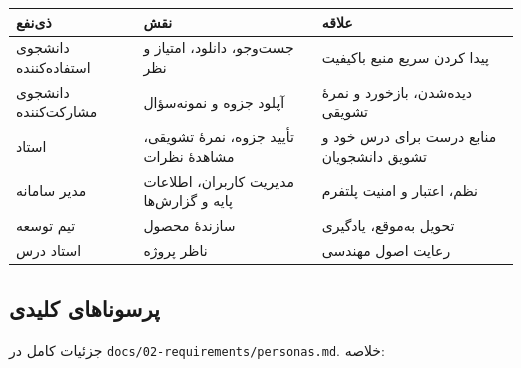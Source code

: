 \documentclass[12pt, a4paper]{article}
\begin{document}
{\def\LTcaptype{none} %
\begin{longtable}[]{@{}
  >{\raggedright\arraybackslash}p{}
  >{\raggedright\arraybackslash}p{}
  >{\raggedright\arraybackslash}p{}@{}}
\toprule\noalign{}
\begin{minipage}[b]{\linewidth}\raggedright
ذی‌نفع
\end{minipage} & \begin{minipage}[b]{\linewidth}\raggedright
نقش
\end{minipage} & \begin{minipage}[b]{\linewidth}\raggedright
علاقه
\end{minipage} \\
\midrule\noalign{}
\endhead
\bottomrule\noalign{}
\endlastfoot
دانشجوی استفاده‌کننده & جست‌وجو، دانلود، امتیاز و نظر & پیدا کردن سریع منبع باکیفیت \\
دانشجوی مشارکت‌کننده & آپلود جزوه و نمونه‌سؤال & دیده‌شدن، بازخورد و نمرهٔ تشویقی \\
استاد & تأیید جزوه، نمرهٔ تشویقی، مشاهدهٔ نظرات & منابع درست برای درس خود و تشویق دانشجویان \\
مدیر سامانه & مدیریت کاربران، اطلاعات پایه و گزارش‌ها & نظم، اعتبار و امنیت پلتفرم \\
تیم توسعه & سازندهٔ محصول & تحویل به‌موقع، یادگیری \\
استاد درس & ناظر پروژه & رعایت اصول مهندسی \\
\end{longtable}
}

\subsection{پرسوناهای کلیدی}

جزئیات کامل در \texttt{docs/02-requirements/personas.md}. خلاصه:
\end{document}
